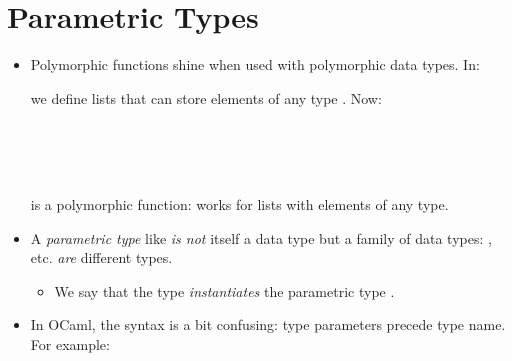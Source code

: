 \documentclass{beamer}
\newcommand{\tmem}[1]{{\em #1\/}}
\newcommand{\tmverbatim}[1]{\text{{\ttfamily{#1}}}}
\begin{document}
\section{Parametric Types}

\begin{itemize}
  \item Polymorphic functions shine when used with polymorphic data types. In:
  
  {}{}{\hlopt{=
  }}{}{\hlopt{\textbar }}{}{}{}{\hlopt{* }}{}
  
  we define lists that can store elements of any type \tmverbatim{'a}. Now:
  
  {\hlstd{\# }}{}{}{\hlopt{=}}{\hlendline{}}\\
  {\hlstd{ \ }}{}{}{}{\hlendline{}}\\
  {\hlstd{ \ \ \ }}{\hlopt{\textbar }}{}{\hlopt{->
  }}{}{}{\hlstd{{\hlendline{}}\\
  \ \ \ }}{\hlopt{\textbar }}{}{\hlopt{(}}{\hlstd{{\textunderscore}}}{\hlopt{, }}{}{\hlopt{) ->
  }}{}{\hlopt{;;}}{\hlendline{}}\\
  {\hlstd{ \ \ \ \ \ }}{}{}{\hlopt{: }}{}{\hlopt{-> }}{}
  
  is a polymorphic function: works for lists with elements of any type.
  
  \item A {\tmem{parametric type}} like {}
  {\tmem{is not}} itself a data type but a family of data types:
  {}{}, {}{} etc. {\tmem{are}} different types.
  \begin{itemize}
    \item We say that the type {}{}
    {\tmem{instantiates}} the parametric type {}. 
  \end{itemize}
  \item In OCaml, the syntax is a bit confusing: type parameters precede type
  name. For example:
  
  {}{\hlopt{(}}{}{\hlopt{, }}{}{\hlopt{)
  }}{}{\hlopt{= }}{}{}{}{}{}{}
  

\end{itemize}
\end{document}
